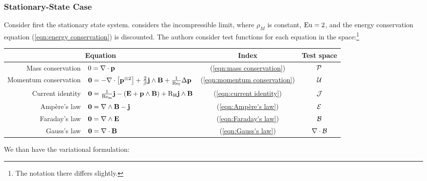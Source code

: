 \subsubsection*{Stationary-State Case}
    Consider first the stationary state system. \cite{LHF22} considers the incompressible limit, where $\rho_{M}$ is constant, $\mathrm{Eu}  =  2$, and the energy conservation equation (\ref{eqn:energy conservation}) is discounted. The authors consider test functions for each equation in the space:\footnote{The notation there differs slightly.}
    \begin{center}\begin{tabular}{ r l c | c }
        \multicolumn{2}{c}{Equation}  &  Index  &  Test space  \\
        \hline\hline
        Mass conservation  &  $0  =  \nabla\cdot\mathbf{p}$  &  (\ref{eqn:mass conservation})  &  $\mathcal{P}$  \\
        Momentum conservation  &  $\mathbf{0} 
         =  - \nabla\cdot\left[\mathbf{p}^{\otimes 2}\right] + \frac{2}{\beta}\mathbf{j}\wedge\mathbf{B} + \frac{1}{\mathrm{Re}_{\mathrm{f}}}\Delta\mathbf{p}$  &  (\ref{eqn:momentum conservation})  &  $\mathcal{U}$  \\
        \hline
        Current identity  &  $\mathbf{0}  =  \frac{1}{\mathrm{Re}_{\mathrm{m}}}\mathbf{j} - (\mathbf{E} + \mathbf{p}\wedge\mathbf{B}) + \mathrm{R}_{\mathrm{H}}\mathbf{j}\wedge\mathbf{B}$  &  (\ref{eqn:current identity})  &  $\mathcal{J}$  \\
        \hline
        Ampère's law  &  $\mathbf{0}  =  \nabla\wedge\mathbf{B} - \mathbf{j}$  &  (\ref{eqn:Ampère's law})  &  $\mathcal{E}$  \\
        Faraday's law  &  $\mathbf{0}  =  \nabla\wedge\mathbf{E}$  &  (\ref{eqn:Faraday's law})  &  $\mathcal{B}$  \\
        Gauss's law  &  $\mathbf{0}  =  \nabla\cdot\mathbf{B}$  &  (\ref{eqn:Gauss's law})  &  $\nabla\cdot\mathcal{B}$  \\
    \end{tabular}\end{center}
    We than have the variational formulation: 
